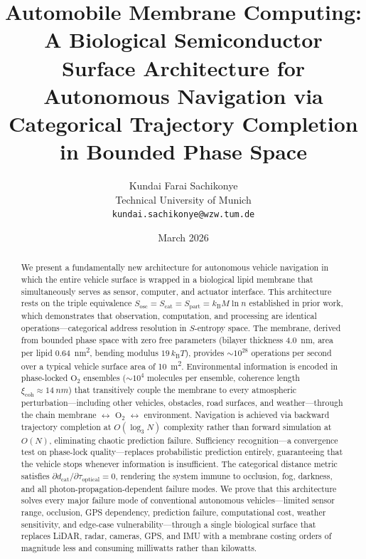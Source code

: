 \documentclass[12pt]{article}
\title{\textbf{Automobile Membrane Computing: A Biological Semiconductor Surface Architecture for Autonomous Navigation via Categorical Trajectory Completion in Bounded Phase Space}}
\author{Kundai Farai Sachikonye \\
  Technical University of Munich \\
  \texttt{kundai.sachikonye@wzw.tum.de}}
\date{March 2026}
\theoremstyle{definition}
\theoremstyle{remark}
\newcommand{\Sosc}{S_{\mathrm{osc}}}
\newcommand{\Scat}{S_{\mathrm{cat}}}
\newcommand{\Spart}{S_{\mathrm{part}}}
\newcommand{\kB}{k_{\mathrm{B}}}
\newcommand{\dcat}{d_{\mathrm{cat}}}
\newcommand{\xicoh}{\xi_{\mathrm{coh}}}
\begin{document}
\maketitle

\begin{abstract}
We present a fundamentally new architecture for autonomous vehicle navigation in which the entire vehicle surface is wrapped in a biological lipid membrane that simultaneously serves as sensor, computer, and actuator interface. This architecture rests on the triple equivalence $\Sosc = \Scat = \Spart = \kB M \ln n$ established in prior work, which demonstrates that observation, computation, and processing are identical operations---categorical address resolution in $S$-entropy space. The membrane, derived from bounded phase space with zero free parameters (bilayer thickness \SI{4.0}{nm}, area per lipid \SI{0.64}{nm^2}, bending modulus $19\,\kB T$), provides $\sim 10^{28}$ operations per second over a typical vehicle surface area of \SI{10}{m^2}. Environmental information is encoded in phase-locked $\mathrm{O}_2$ ensembles ($\sim 10^4$ molecules per ensemble, coherence length $\xicoh \approx \SI{14}{nm}$) that transitively couple the membrane to every atmospheric perturbation---including other vehicles, obstacles, road surfaces, and weather---through the chain membrane $\leftrightarrow$ $\mathrm{O}_2$ $\leftrightarrow$ environment. Navigation is achieved via backward trajectory completion at $O(\log_3 N)$ complexity rather than forward simulation at $O(N)$, eliminating chaotic prediction failure. Sufficiency recognition---a convergence test on phase-lock quality---replaces probabilistic prediction entirely, guaranteeing that the vehicle stops whenever information is insufficient. The categorical distance metric satisfies $\partial \dcat / \partial \tau_{\mathrm{optical}} = 0$, rendering the system immune to occlusion, fog, darkness, and all photon-propagation-dependent failure modes. We prove that this architecture solves every major failure mode of conventional autonomous vehicles---limited sensor range, occlusion, GPS dependency, prediction failure, computational cost, weather sensitivity, and edge-case vulnerability---through a single biological surface that replaces LiDAR, radar, cameras, GPS, and IMU with a membrane costing orders of magnitude less and consuming milliwatts rather than kilowatts.
\end{abstract}

\tableofcontents
\newpage

\end{document}
